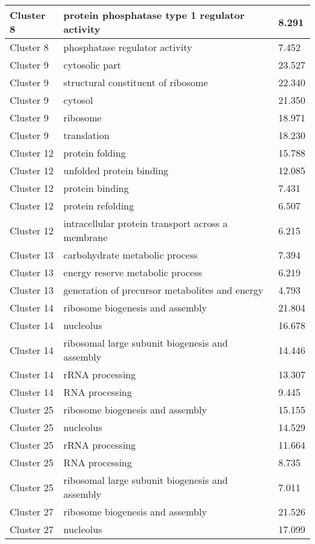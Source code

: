 \begin{longtable}{|p{1in}|p{4in}|p{1in}|}
\hline
Cluster 8 & protein phosphatase type 1 regulator activity & 8.291 \\ \hline
Cluster 8 & phosphatase regulator activity & 7.452 \\ \hline
Cluster 9 & cytosolic part & 23.527 \\ \hline
Cluster 9 & structural constituent of ribosome & 22.340 \\ \hline
Cluster 9 & cytosol & 21.350 \\ \hline
Cluster 9 & ribosome & 18.971 \\ \hline
Cluster 9 & translation & 18.230 \\ \hline
Cluster 12 & protein folding & 15.788 \\ \hline
Cluster 12 & unfolded protein binding & 12.085 \\ \hline
Cluster 12 & protein binding & 7.431 \\ \hline
Cluster 12 & protein refolding & 6.507 \\ \hline
Cluster 12 & intracellular protein transport across a membrane & 6.215 \\ \hline
Cluster 13 & carbohydrate metabolic process & 7.394 \\ \hline
Cluster 13 & energy reserve metabolic process & 6.219 \\ \hline
Cluster 13 & generation of precursor metabolites and energy & 4.793 \\ \hline
Cluster 14 & ribosome biogenesis and assembly & 21.804 \\ \hline
Cluster 14 & nucleolus & 16.678 \\ \hline
Cluster 14 & ribosomal large subunit biogenesis and assembly & 14.446 \\ \hline
Cluster 14 & rRNA processing & 13.307 \\ \hline
Cluster 14 & RNA processing & 9.445 \\ \hline
Cluster 25 & ribosome biogenesis and assembly & 15.155 \\ \hline
Cluster 25 & nucleolus & 14.529 \\ \hline
Cluster 25 & rRNA processing & 11.664 \\ \hline
Cluster 25 & RNA processing & 8.735 \\ \hline
Cluster 25 & ribosomal large subunit biogenesis and assembly & 7.011 \\ \hline
Cluster 27 & ribosome biogenesis and assembly & 21.526 \\ \hline
Cluster 27 & nucleolus & 17.099 \\ \hline

\end{longtable}
